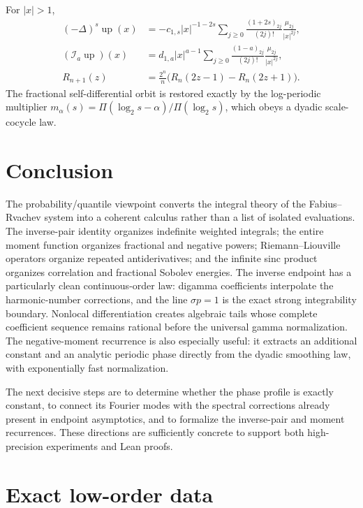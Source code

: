 \documentclass[11pt,oneside]{article}
\theoremstyle{definition}
\newcommand{\upf}{\operatorname{up}}
\begin{document}
\begin{resultbox}
For \(|x|>1\),
\begin{align*}
 (-\Delta)^s\upf(x)
 &=-c_{1,s}|x|^{-1-2s}
   \sum_{j\ge0}\frac{(1+2s)_{2j}}{(2j)!}
   \frac{\mu_{2j}}{|x|^{2j}},\\
 (\mathcal I_a\upf)(x)
 &=d_{1,a}|x|^{a-1}
   \sum_{j\ge0}\frac{(1-a)_{2j}}{(2j)!}
   \frac{\mu_{2j}}{|x|^{2j}},\\
 R_{n+1}(z)
 &=\frac{2^n}{n}\bigl(R_n(2z-1)-R_n(2z+1)\bigr).
\end{align*}
The fractional self-differential orbit is restored exactly by the log-periodic multiplier
\(
 m_\alpha(s)=\Pi(\log_2s-\alpha)/\Pi(\log_2s)
\), which obeys a dyadic scale-cocycle law.
\end{resultbox}


\section{Conclusion}

The probability/quantile viewpoint converts the integral theory of the Fabius--Rvachev
system into a coherent calculus rather than a list of isolated evaluations.  The
inverse-pair identity organizes indefinite weighted integrals; the entire moment function
organizes fractional and negative powers; Riemann--Liouville operators organize repeated
antiderivatives; and the infinite sinc product organizes correlation and fractional
Sobolev energies.  The inverse endpoint has a particularly clean continuous-order law:
digamma coefficients interpolate the harmonic-number corrections, and the line
\(\sigma p=1\) is the exact strong integrability boundary.  Nonlocal differentiation
creates algebraic tails whose complete coefficient sequence remains rational before the
universal gamma normalization.  The negative-moment recurrence is also especially
useful: it extracts an additional constant and an analytic periodic phase directly from
the dyadic smoothing law, with exponentially fast normalization.

The next decisive steps are to determine whether the phase profile is exactly constant,
to connect its Fourier modes with the spectral corrections already present in endpoint
asymptotics, and to formalize the inverse-pair and moment recurrences.  These directions
are sufficiently concrete to support both high-precision experiments and Lean proofs.

\appendix

\section{Exact low-order data}
\end{document}
